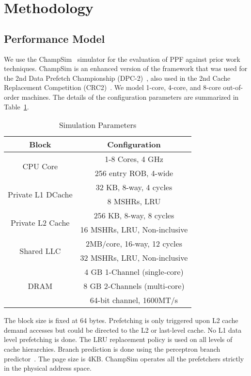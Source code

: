 \section{Methodology}
\label{Method}

\subsection{Performance Model}
\label{Method-Model}
We use the ChampSim~\cite{Champsim} simulator for the evaluation of
PPF against prior work techniques.  ChampSim is an enhanced version of
the framework that was used for the 2nd Data Prefetch Championship
(DPC-2)~\cite{DPC_2}, also used in the 2nd Cache Replacement
Competition (CRC2)~\cite{CRC_2}.  We model 1-core, 4-core, and 8-core
out-of-order machines.  The details of the configuration parameters
are summarized in Table~\ref{tab:Sim_params}.

\begin{table}[]
    \centering
    \begin{adjustbox}{width=0.9\columnwidth}
    \begin{tabular}{|c|c|}
    \hline
    	 Block & Configuration\\
    \hline
	 \multirow{2}{1.5cm}{CPU Core} 		& 1-8 Cores, 4 GHz\\
						& 256 entry ROB, 4-wide\\
    \hline
         \multirow{2}{2.7cm}{Private L1 DCache} & 32 KB, 8-way, 4 cycles\\
						& 8 MSHRs, LRU\\
    \hline
         \multirow{2}{2.4cm}{Private L2 Cache}  & 256 KB, 8-way, 8 cycles\\
						& 16 MSHRs, LRU, Non-inclusive\\		
    \hline
         \multirow{2}{1.7cm}{Shared LLC} 	& 2MB/core, 16-way, 12 cycles\\
						& 32 MSHRs, LRU, Non-inclusive\\
    \hline
         \multirow{3}{1.1cm}{DRAM} 		& 4 GB 1-Channel (single-core)\\ 
						& 8 GB 2-Channels (multi-core)\\ 
						& 64-bit channel, 1600MT/s\\
    \hline
    \end{tabular}
    \end{adjustbox}
    \caption{Simulation Parameters}
    \label{tab:Sim_params}
\end{table}

The block size is fixed at 64 bytes.  Prefetching is only triggered
upon L2 cache demand accesses but could be directed to the L2 or
last-level cache.  No L1 data level prefetching is done. The LRU
replacement policy is used on all levels of cache hierarchies. Branch
prediction is done using the perceptron branch
predictor~\cite{PerceptronPredictor}.  The page size is 4KB.  ChampSim
operates all the prefetchers strictly in the physical address space.

